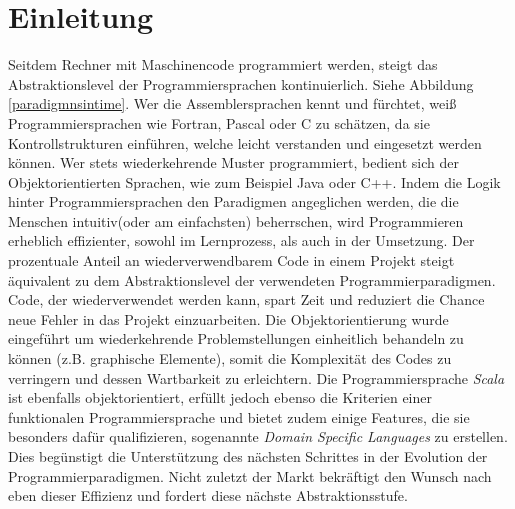 
\chapter{Einleitung}
Seitdem Rechner mit Maschinencode programmiert werden, steigt das Abstraktionslevel der Programmiersprachen kontinuierlich. Siehe Abbildung \ref{paradigmnsintime}. Wer die Assemblersprachen kennt und fürchtet, weiß Programmiersprachen wie Fortran, Pascal oder C zu schätzen, da sie Kontrollstrukturen einführen, welche leicht verstanden und eingesetzt werden können. Wer stets wiederkehrende Muster programmiert, bedient sich der Objektorientierten Sprachen, wie zum Beispiel Java oder C++.
Indem die Logik hinter Programmiersprachen den Paradigmen angeglichen werden, die die Menschen intuitiv(oder am einfachsten) beherrschen, wird Programmieren erheblich effizienter, sowohl im Lernprozess, als auch in der Umsetzung. 
Der prozentuale Anteil an wiederverwendbarem Code in einem Projekt steigt äquivalent zu dem Abstraktionslevel der verwendeten Programmierparadigmen. Code, der wiederverwendet werden kann, spart Zeit und reduziert die Chance neue Fehler in das Projekt einzuarbeiten. Die Objektorientierung wurde eingeführt um wiederkehrende Problemstellungen einheitlich behandeln zu können (z.B. graphische Elemente), somit die Komplexität des Codes zu verringern und dessen Wartbarkeit zu erleichtern. Die Programmiersprache \textit{Scala} ist ebenfalls objektorientiert, erfüllt jedoch ebenso die Kriterien einer funktionalen Programmiersprache und bietet zudem einige Features, die sie besonders dafür qualifizieren, sogenannte \textit{Domain Specific Languages} zu erstellen. Dies begünstigt die Unterstützung des nächsten Schrittes in der Evolution der Programmierparadigmen. Nicht zuletzt der Markt bekräftigt den Wunsch nach eben dieser Effizienz und fordert diese nächste Abstraktionsstufe. 
